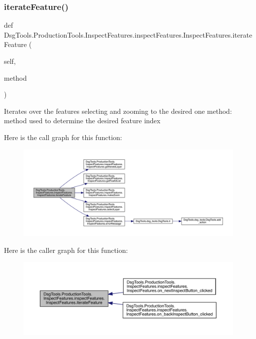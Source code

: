 \subsubsection{\texorpdfstring{iterate\+Feature()}{iterateFeature()}}
{\footnotesize\ttfamily def Dsg\+Tools.\+Production\+Tools.\+Inspect\+Features.\+inspect\+Features.\+Inspect\+Features.\+iterate\+Feature (\begin{DoxyParamCaption}\item[{}]{self,  }\item[{}]{method }\end{DoxyParamCaption})}

\begin{DoxyVerb}Iterates over the features selecting and zooming to the desired one
method: method used to determine the desired feature index
\end{DoxyVerb}
 Here is the call graph for this function\+:
\nopagebreak
\begin{figure}[H]
\begin{center}
\leavevmode
\includegraphics[width=350pt]{class_dsg_tools_1_1_production_tools_1_1_inspect_features_1_1inspect_features_1_1_inspect_features_a443772b701b244f7da7f33686a0b9fde_cgraph}
\end{center}
\end{figure}
Here is the caller graph for this function\+:
\nopagebreak
\begin{figure}[H]
\begin{center}
\leavevmode
\includegraphics[width=350pt]{class_dsg_tools_1_1_production_tools_1_1_inspect_features_1_1inspect_features_1_1_inspect_features_a443772b701b244f7da7f33686a0b9fde_icgraph}
\end{center}
\end{figure}
